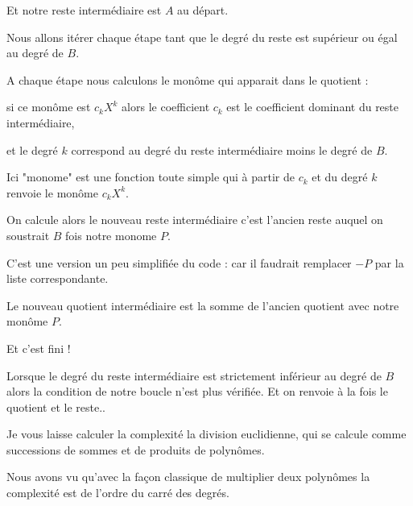 Et notre reste intermédiaire est $A$ au départ.
  
\change

Nous allons itérer chaque étape tant que le degré du reste est supérieur ou égal au degré de $B$.

  
\change

A chaque étape nous calculons le monôme qui apparait dans le quotient :

si ce monôme est $c_k X^k$ alors le coefficient $c_k$ est le  coefficient dominant du reste intermédiaire, 

et le degré $k$ correspond au degré du reste intermédiaire moins le degré de $B$.

Ici "monome" est une fonction toute simple qui à partir de $c_k$ et du degré $k$ renvoie le monôme
$c_k X^k$.


\change

On calcule alors le nouveau reste intermédiaire c'est l'ancien reste auquel on soustrait $B$ fois notre monome $P$.

C'est une version un peu simplifiée du code : car il faudrait remplacer  $-P$  par la liste correspondante.
  
\change

Le nouveau quotient intermédiaire est la somme de l'ancien quotient avec notre monôme $P$.

\change

Et c'est fini !

Lorsque le degré du reste intermédiaire est strictement inférieur au degré de $B$ alors la condition
de notre boucle n'est plus vérifiée. Et on renvoie à la fois le quotient et le reste..

%   
% 
% 
% 

Je vous laisse calculer la complexité la division euclidienne, qui se calcule comme successions de
sommes et de produits de polynômes.


\diapo

Nous avons vu qu'avec la façon classique de multiplier deux polynômes la complexité 
est de l'ordre du carré des degrés.

